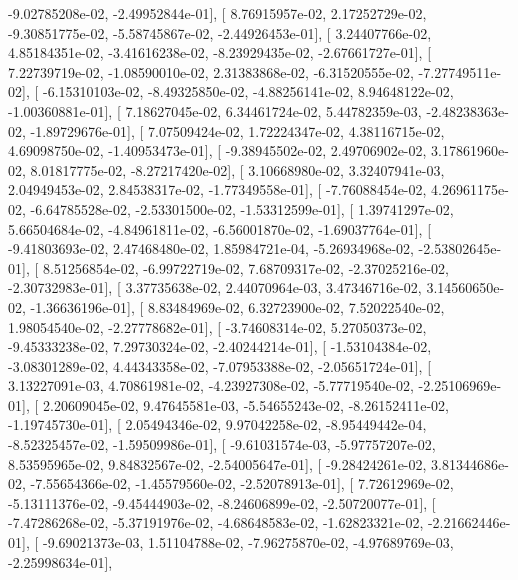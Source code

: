 \documentclass{article}
\begin{document}
         -9.02785208e-02,  -2.49952844e-01],
       [  8.76915957e-02,   2.17252729e-02,  -9.30851775e-02,
         -5.58745867e-02,  -2.44926453e-01],
       [  3.24407766e-02,   4.85184351e-02,  -3.41616238e-02,
         -8.23929435e-02,  -2.67661727e-01],
       [  7.22739719e-02,  -1.08590010e-02,   2.31383868e-02,
         -6.31520555e-02,  -7.27749511e-02],
       [ -6.15310103e-02,  -8.49325850e-02,  -4.88256141e-02,
          8.94648122e-02,  -1.00360881e-01],
       [  7.18627045e-02,   6.34461724e-02,   5.44782359e-03,
         -2.48238363e-02,  -1.89729676e-01],
       [  7.07509424e-02,   1.72224347e-02,   4.38116715e-02,
          4.69098750e-02,  -1.40953473e-01],
       [ -9.38945502e-02,   2.49706902e-02,   3.17861960e-02,
          8.01817775e-02,  -8.27217420e-02],
       [  3.10668980e-02,   3.32407941e-03,   2.04949453e-02,
          2.84538317e-02,  -1.77349558e-01],
       [ -7.76088454e-02,   4.26961175e-02,  -6.64785528e-02,
         -2.53301500e-02,  -1.53312599e-01],
       [  1.39741297e-02,   5.66504684e-02,  -4.84961811e-02,
         -6.56001870e-02,  -1.69037764e-01],
       [ -9.41803693e-02,   2.47468480e-02,   1.85984721e-04,
         -5.26934968e-02,  -2.53802645e-01],
       [  8.51256854e-02,  -6.99722719e-02,   7.68709317e-02,
         -2.37025216e-02,  -2.30732983e-01],
       [  3.37735638e-02,   2.44070964e-03,   3.47346716e-02,
          3.14560650e-02,  -1.36636196e-01],
       [  8.83484969e-02,   6.32723900e-02,   7.52022540e-02,
          1.98054540e-02,  -2.27778682e-01],
       [ -3.74608314e-02,   5.27050373e-02,  -9.45333238e-02,
          7.29730324e-02,  -2.40244214e-01],
       [ -1.53104384e-02,  -3.08301289e-02,   4.44343358e-02,
         -7.07953388e-02,  -2.05651724e-01],
       [  3.13227091e-03,   4.70861981e-02,  -4.23927308e-02,
         -5.77719540e-02,  -2.25106969e-01],
       [  2.20609045e-02,   9.47645581e-03,  -5.54655243e-02,
         -8.26152411e-02,  -1.19745730e-01],
       [  2.05494346e-02,   9.97042258e-02,  -8.95449442e-04,
         -8.52325457e-02,  -1.59509986e-01],
       [ -9.61031574e-03,  -5.97757207e-02,   8.53595965e-02,
          9.84832567e-02,  -2.54005647e-01],
       [ -9.28424261e-02,   3.81344686e-02,  -7.55654366e-02,
         -1.45579560e-02,  -2.52078913e-01],
       [  7.72612969e-02,  -5.13111376e-02,  -9.45444903e-02,
         -8.24606899e-02,  -2.50720077e-01],
       [ -7.47286268e-02,  -5.37191976e-02,  -4.68648583e-02,
         -1.62823321e-02,  -2.21662446e-01],
       [ -9.69021373e-03,   1.51104788e-02,  -7.96275870e-02,
         -4.97689769e-03,  -2.25998634e-01],
\end{document}
